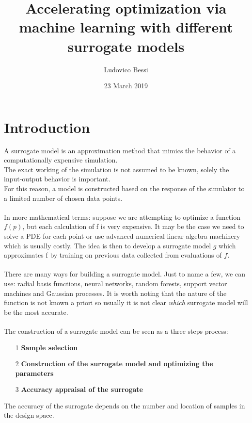 \documentclass[11pt,a4paper,oneside,titlepage,openright]{book}
\begin{document}
 
\title{Accelerating optimization via machine learning with different surrogate models}
\author{Ludovico Bessi}

\date{23 March 2019}
\maketitle



\chapter*{Introduction}

A surrogate model is an approximation method that mimics the behavior of a computationally expensive simulation.\\
The exact working of the simulation is not assumed to be known, solely the input-output behavior is important. \\
For this reason, a model is constructed based on the response of the simulator to a limited number of chosen data points.\\\\
In more mathematical terms: suppose we are attempting to optimize a function $f(p)$, but each calculation of f is very expensive. It may be the case we need to solve a PDE for each point or use advanced numerical linear algebra machinery which is usually costly. 
The idea is then to develop a surrogate model $g$ which approximates f by training on previous data collected from evaluations of $f$.\\\\
There are many ways for building a surrogate model. Just to name a few, we can use: radial basis functions, neural networks, random forests, support vector machines and Gaussian processes. It is worth noting that the nature of the function is not known a priori so usually it  is not clear \textit{which} surrogate model will be the most accurate.\\\\
The construction of a surrogate model can be seen as a three steps process:
\begin{itemize}
\item[1]\textbf{Sample selection}
\item[2]\textbf{Construction of the surrogate model and optimizing the parameters}
\item[3]\textbf{Accuracy appraisal of the surrogate}
\end{itemize}
The accuracy of the surrogate depends on the number and location of samples in the design space. 
\newpage
\end{document}
